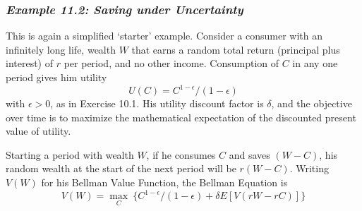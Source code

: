 \subsubsection*{\textit{Example 11.2: Saving under Uncertainty}}

This is again a simplified `starter' example. Consider a consumer with an infinitely long life, wealth $W$ that earns a random total return (principal plus interest) of $r$ per period, and no other income. Consumption of $C$ in any one period gives him utility
\begin{equation} \label{equa11.17}
 U(C) = C^{1-\epsilon} / (1-\epsilon)
\end{equation}
with $\epsilon > 0$, as in Exercise 10.1. His utility discount factor is $\delta$, and the objective over time is to maximize the mathematical expectation of the discounted present value of utility.

Starting a period with wealth $W$, if he consumes $C$ and saves $(W-C)$, his random wealth at the start of the next period will be $r(W-C)$. Writing $V(W)$ for his Bellman Value Function, the Bellman Equation is 
\begin{equation} \label{equa11.18}
 V(W) = \mathop{\max}\limits_C \  \{ C^{1-\epsilon}/(1-\epsilon) + \delta E[V(rW -rC)]   \}
\end{equation}

